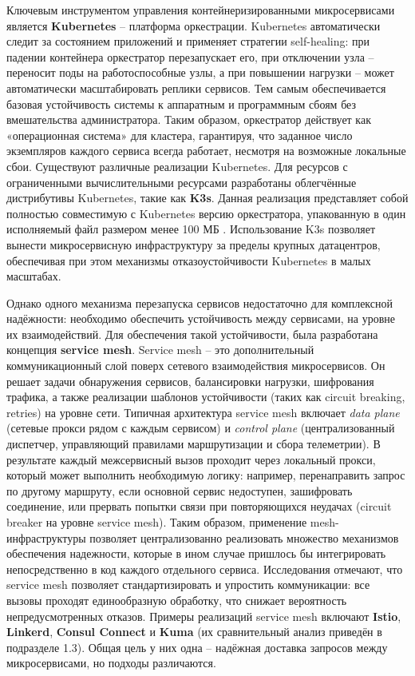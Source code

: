 Ключевым инструментом управления контейнеризированными микросервисами является \textbf{Kubernetes} – платформа оркестрации. Kubernetes автоматически следит за состоянием приложений и применяет стратегии self-healing: при падении контейнера оркестратор перезапускает его, при отключении узла – переносит поды на работоспособные узлы, а при повышении нагрузки – может автоматически масштабировать реплики сервисов. Тем самым обеспечивается базовая устойчивость системы к аппаратным и программным сбоям без вмешательства администратора. Таким образом, оркестратор действует как «операционная система» для кластера, гарантируя, что заданное число экземпляров каждого сервиса всегда работает, несмотря на возможные локальные сбои. Существуют различные реализации Kubernetes. Для ресурсов с ограниченными вычислительными ресурсами разработаны облегчённые дистрибутивы Kubernetes, такие как \textbf{K3s}. Данная реализация представляет собой полностью совместимую с Kubernetes версию оркестратора, упакованную в один исполняемый файл размером менее 100 МБ \cite{hoffman2023k3s}. Использование K3s позволяет вынести микросервисную инфраструктуру за пределы крупных датацентров, обеспечивая при этом механизмы отказоустойчивости Kubernetes в малых масштабах.

Однако одного механизма перезапуска сервисов недостаточно для комплексной надёжности: необходимо обеспечить устойчивость между сервисами, на уровне их взаимодействий. Для обеспечения такой устойчивости, была разработана концепция \textbf{service mesh}. Service mesh – это дополнительный коммуникационный слой поверх сетевого взаимодействия микросервисов. Он решает задачи обнаружения сервисов, балансировки нагрузки, шифрования трафика, а также реализации шаблонов устойчивости (таких как circuit breaking, retries) на уровне сети. Типичная архитектура service mesh включает \textit{data plane} (сетевые прокси рядом с каждым сервисом) и \textit{control plane} (централизованный диспетчер, управляющий правилами маршрутизации и сбора телеметрии). В результате каждый межсервисный вызов проходит через локальный прокси, который может выполнить необходимую логику: например, перенаправить запрос по другому маршруту, если основной сервис недоступен, зашифровать соединение, или прервать попытки связи при повторяющихся неудачах (circuit breaker на уровне service mesh). Таким образом, применение mesh-инфраструктуры позволяет централизованно реализовать множество механизмов обеспечения надежности, которые в ином случае пришлось бы интегрировать непосредственно в код каждого отдельного сервиса. Исследования отмечают, что service mesh позволяет стандартизировать и упростить коммуникации: все вызовы проходят единообразную обработку, что снижает вероятность непредусмотренных отказов\cite{palavesam2025}. Примеры реализаций service mesh включают \textbf{Istio}, \textbf{Linkerd}, \textbf{Consul Connect} и \textbf{Kuma} (их сравнительный анализ приведён в подразделе 1.3). Общая цель у них одна – надёжная доставка запросов между микросервисами\cite{farkiani2022}, но подходы различаются.

